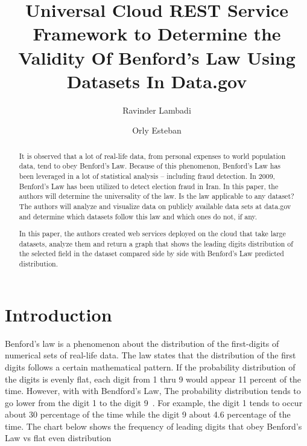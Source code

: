 
\title{Universal Cloud REST Service Framework to Determine the Validity Of Benford’s Law Using Datasets In Data.gov}

\author{Ravinder Lambadi}


\author{Orly Esteban}

\begin{abstract}
It is observed that a lot of real-life data, from personal 
expenses to world population data, tend to obey Benford’s Law. 
Because of this phenomenon, Benford’s Law has been leveraged 
in a lot of statistical analysis – including fraud detection. 
In 2009,  Benford’s Law has been utilized to detect election 
fraud in Iran. In this paper, the authors will determine the 
universality of the law. Is the law applicable to any dataset? 
The authors will analyze and visualize data on publicly 
available data sets at data.gov and determine which 
datasets follow this law and which ones do not, if any.

In this paper, the authors created web services deployed 
on the cloud that take large datasets, analyze them and 
return a graph that shows the leading digits distribution 
of the selected field in the dataset compared side by side 
with Benford’s Law predicted distribution.

\end{abstract}


\maketitle

\section{Introduction}
Benford’s law is a phenomenon about the distribution 
of the first-digits of numerical sets of real-life data. 
The law states that the distribution of the first digits
follows a certain mathematical pattern. If the probability 
distribution of the digits is evenly flat, each digit from 
1 thru 9 would appear 11 percent of the time. However, 
with with Bendford’s Law, The probability distribution 
tends to go lower from the digit 1 to the digit 
9~\cite{hid-sp18-514-benfordwiki}.
For example, the digit 1 tends to occur about 30 percentage 
of the time while the digit 9 about 4.6 percentage 
of the time. The chart below shows the frequency of 
leading digits that obey Benford’s Law vs flat even distribution


